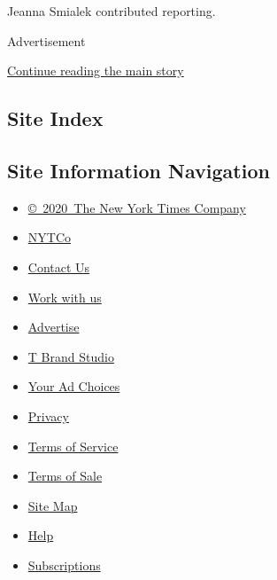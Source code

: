 Jeanna Smialek contributed reporting.

Advertisement

\protect\hyperlink{after-bottom}{Continue reading the main story}

\hypertarget{site-index}{%
\subsection{Site Index}\label{site-index}}

\hypertarget{site-information-navigation}{%
\subsection{Site Information
Navigation}\label{site-information-navigation}}

\begin{itemize}
\tightlist
\item
  \href{https://help.nytimes3xbfgragh.onion/hc/en-us/articles/115014792127-Copyright-notice}{©~2020~The
  New York Times Company}
\end{itemize}

\begin{itemize}
\tightlist
\item
  \href{https://www.nytco.com/}{NYTCo}
\item
  \href{https://help.nytimes3xbfgragh.onion/hc/en-us/articles/115015385887-Contact-Us}{Contact
  Us}
\item
  \href{https://www.nytco.com/careers/}{Work with us}
\item
  \href{https://nytmediakit.com/}{Advertise}
\item
  \href{http://www.tbrandstudio.com/}{T Brand Studio}
\item
  \href{https://www.nytimes3xbfgragh.onion/privacy/cookie-policy\#how-do-i-manage-trackers}{Your
  Ad Choices}
\item
  \href{https://www.nytimes3xbfgragh.onion/privacy}{Privacy}
\item
  \href{https://help.nytimes3xbfgragh.onion/hc/en-us/articles/115014893428-Terms-of-service}{Terms
  of Service}
\item
  \href{https://help.nytimes3xbfgragh.onion/hc/en-us/articles/115014893968-Terms-of-sale}{Terms
  of Sale}
\item
  \href{https://spiderbites.nytimes3xbfgragh.onion}{Site Map}
\item
  \href{https://help.nytimes3xbfgragh.onion/hc/en-us}{Help}
\item
  \href{https://www.nytimes3xbfgragh.onion/subscription?campaignId=37WXW}{Subscriptions}
\end{itemize}
